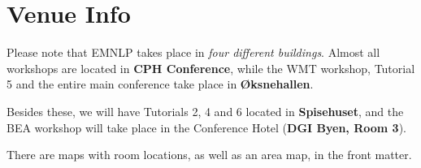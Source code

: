 \setheaders{}{}
\section{Venue Info}{}

Please note that EMNLP takes place in \textit{four different buildings}. Almost all workshops are located in \textbf{CPH Conference}, while the WMT workshop, Tutorial 5 and the entire main conference take place in \textbf{Øksnehallen}. 

Besides these, we will have Tutorials 2, 4 and 6 located in \textbf{Spisehuset}, and the BEA workshop will take place in the Conference Hotel (\textbf{DGI Byen, Room 3}).

There are maps with room locations, as well as an area map, in the front matter.